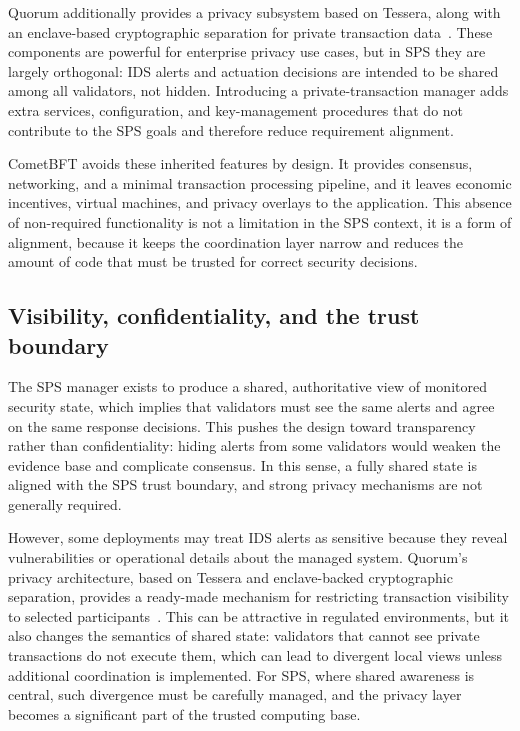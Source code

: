 Quorum additionally provides a privacy subsystem based on Tessera, along with an enclave-based cryptographic separation for private transaction data~\cite{goquorumPrivacy}. These components are powerful for enterprise privacy use cases, but in SPS they are largely orthogonal: IDS alerts and actuation decisions are intended to be shared among all validators, not hidden. Introducing a private-transaction manager adds extra services, configuration, and key-management procedures that do not contribute to the SPS goals and therefore reduce requirement alignment.

CometBFT avoids these inherited features by design. It provides consensus, networking, and a minimal transaction processing pipeline, and it leaves economic incentives, virtual machines, and privacy overlays to the application. This absence of non-required functionality is not a limitation in the SPS context, it is a form of alignment, because it keeps the coordination layer narrow and reduces the amount of code that must be trusted for correct security decisions.

\subsection{Visibility, confidentiality, and the trust boundary}
The SPS manager exists to produce a shared, authoritative view of monitored security state, which implies that validators must see the same alerts and agree on the same response decisions. This pushes the design toward transparency rather than confidentiality: hiding alerts from some validators would weaken the evidence base and complicate consensus. In this sense, a fully shared state is aligned with the SPS trust boundary, and strong privacy mechanisms are not generally required.

However, some deployments may treat IDS alerts as sensitive because they reveal vulnerabilities or operational details about the managed system. Quorum's privacy architecture, based on Tessera and enclave-backed cryptographic separation, provides a ready-made mechanism for restricting transaction visibility to selected participants~\cite{goquorumPrivacy}. This can be attractive in regulated environments, but it also changes the semantics of shared state: validators that cannot see private transactions do not execute them, which can lead to divergent local views unless additional coordination is implemented. For SPS, where shared awareness is central, such divergence must be carefully managed, and the privacy layer becomes a significant part of the trusted computing base.

